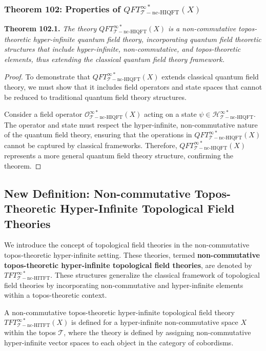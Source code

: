 \documentclass{article}
\begin{document}
\subsubsection{Theorem 102: Properties of \(QFT_{\mathcal{T}-\text{nc-HIQFT}}^{\infty *}(X)\)}
\textbf{Theorem 102.1.} \textit{The theory \(QFT_{\mathcal{T}-\text{nc-HIQFT}}^{\infty *}(X)\) is a non-commutative topos-theoretic hyper-infinite quantum field theory, incorporating quantum field theoretic structures that include hyper-infinite, non-commutative, and topos-theoretic elements, thus extending the classical quantum field theory framework.}

\begin{proof}
To demonstrate that \(QFT_{\mathcal{T}-\text{nc-HIQFT}}^{\infty *}(X)\) extends classical quantum field theory, we must show that it includes field operators and state spaces that cannot be reduced to traditional quantum field theory structures.

Consider a field operator \(\mathcal{O}_{\mathcal{T}-\text{nc-HIQFT}}^{\infty *}(X)\) acting on a state \(\psi \in \mathcal{H}_{\mathcal{T}-\text{nc-HIQFT}}^{\infty *}\). The operator and state must respect the hyper-infinite, non-commutative nature of the quantum field theory, ensuring that the operations in \(QFT_{\mathcal{T}-\text{nc-HIQFT}}^{\infty *}(X)\) cannot be captured by classical frameworks. Therefore, \(QFT_{\mathcal{T}-\text{nc-HIQFT}}^{\infty *}(X)\) represents a more general quantum field theory structure, confirming the theorem.
\end{proof}

\subsection{New Definition: Non-commutative Topos-Theoretic Hyper-Infinite Topological Field Theories}
We introduce the concept of topological field theories in the non-commutative topos-theoretic hyper-infinite setting. These theories, termed \textbf{non-commutative topos-theoretic hyper-infinite topological field theories}, are denoted by \(TFT_{\mathcal{T}-\text{nc-HITFT}}^{\infty *}\). These structures generalize the classical framework of topological field theories by incorporating non-commutative and hyper-infinite elements within a topos-theoretic context.

A non-commutative topos-theoretic hyper-infinite topological field theory \(TFT_{\mathcal{T}-\text{nc-HITFT}}^{\infty *}(X)\) is defined for a hyper-infinite non-commutative space \(X\) within the topos \(\mathcal{T}\), where the theory is defined by assigning non-commutative hyper-infinite vector spaces to each object in the category of cobordisms.
\end{document}
